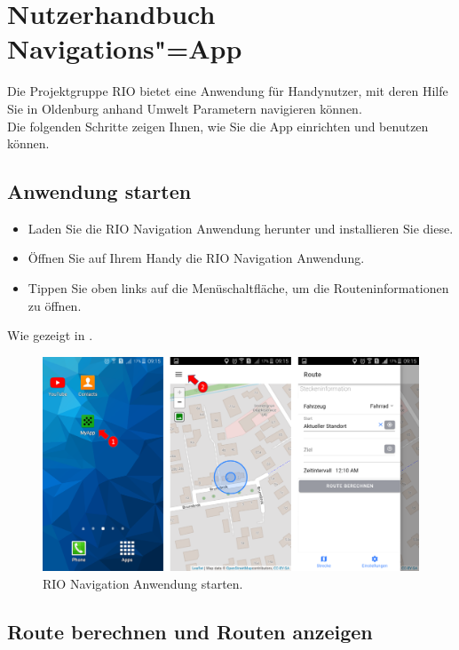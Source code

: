 \section{Nutzerhandbuch Navigations"=App}
Die Projektgruppe RIO bietet eine Anwendung für Handynutzer, mit deren Hilfe Sie in Oldenburg anhand Umwelt Parametern navigieren können.\\
Die folgenden Schritte zeigen Ihnen, wie Sie die App einrichten und benutzen können.
 
\subsection{Anwendung starten}

\begin{itemize}
	\item Laden Sie die RIO Navigation Anwendung herunter und installieren Sie diese.
  \item Öffnen Sie auf Ihrem Handy die RIO Navigation Anwendung.
  \item Tippen Sie oben links auf die Menüschaltfläche, um die Routeninformationen zu öffnen.
\end{itemize}
Wie gezeigt in .
\begin{figure}[h!]
\centerline{\includegraphics[height=8 cm]{./ressourcen/nutzerhandbuch/start_up.png}}
\caption{RIO Navigation Anwendung starten.}
\label{fig:app:starten}
\end{figure}

\newpage
\subsection{Route berechnen und Routen anzeigen}
